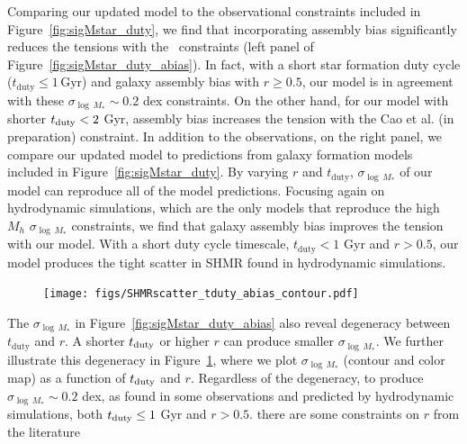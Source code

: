 \documentclass[12pt, letterpaper, preprint, tighten]{aastex62}
\newcommand{\ch}[1]{\color{orange}{\bf CH:} #1}
\begin{document}
Comparing our updated model to the observational constraints included in 
Figure~\ref{fig:sigMstar_duty}, we find that incorporating assembly bias 
significantly reduces the tensions with the~\cite{more2011, leauthaud2012, reddick2013, tinker2013, zu2015} 
constraints (left panel of Figure~\ref{fig:sigMstar_duty_abias}). In fact, 
with a short star formation duty cycle ($t_\mathrm{duty} \leq 1\,\mathrm{Gyr}$) 
and galaxy assembly bias with $r \ge 0.5$, our model is in agreement with 
these $\sigma_{\log\,M_*} \sim 0.2$ dex constraints. On the other hand, 
for our model with shorter $t_{\rm duty} < 2$ Gyr, assembly bias increases 
the tension with the Cao et al. (in preparation) constraint. 
In addition to the observations, on the right panel, we compare our updated 
model to predictions from galaxy formation models included in Figure~\ref{fig:sigMstar_duty}.
By varying $r$ and $t_\mathrm{duty}$, $\sigma_{\log\,M_*}$ of our model 
can reproduce all of the model predictions. Focusing again on hydrodynamic
simulations, which are the only models that reproduce the high $M_h$ 
$\sigma_{\log\,M_*}$ constraints, we find that galaxy assembly bias 
improves the tension with our model. With a short duty cycle timescale, 
$t_\mathrm{duty} < 1$ Gyr and $r > 0.5$, our model produces the tight
scatter in SHMR found in hydrodynamic simulations. 

\begin{figure}
\begin{center}
\texttt{[image: figs/SHMRscatter\_tduty\_abias\_contour.pdf]}
    \caption{}
\label{fig:r_tduty}
\end{center}
\end{figure}

The $\sigma_{\log\,M_*}$ in Figure~\ref{fig:sigMstar_duty_abias} also 
reveal degeneracy between $t_\mathrm{duty}$ and $r$. A shorter
$t_{\rm duty}$ or higher $r$ can produce smaller $\sigma_{\log\,M_*}$. 
We further illustrate this degeneracy in Figure~\ref{fig:r_tduty}, where we
plot $\sigma_{\log\,M_*}$ (contour and color map) as a function of 
$t_{\rm duty}$ and $r$. Regardless of the degeneracy, to produce 
$\sigma_{\log\,M_*} \sim 0.2$ dex, as found in some observations and 
predicted by hydrodynamic simulations, both $t_{\rm duty} \leq 1$ Gyr and 
$r > 0.5$.  {\ch there are some constraints on $r$ from the literature} 
\end{document}
